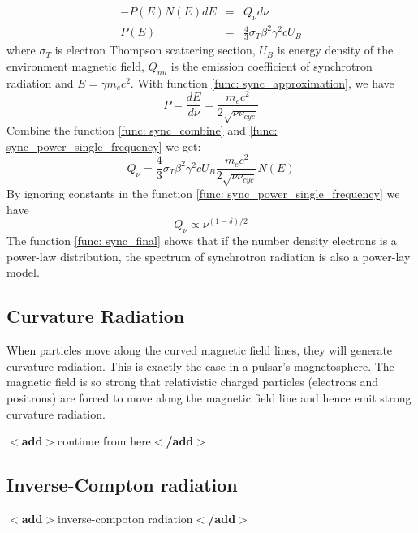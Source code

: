 \documentclass[12pt]{report}
\newcommand{\add}[1]{
  $<$\textbf{add}$>$#1$<$\textbf{/add}$>$
}
\begin{document}
          \begin{eqnarray}
            \label{func: sync_power_single_frequency}
            -P\left(E\right)N\left(E\right)dE &=& Q_{\nu} d\nu\\
            P\left(E\right) &=& \frac{4}{3} \sigma_{T} \beta^2 \gamma^2 c U_B
          \end{eqnarray} 
          where $\sigma_{T}$ is electron Thompson scattering section, $U_B$ is energy density of the environment 
          magnetic field,  $Q_{nu}$ is the emission coefficient of synchrotron radiation 
          and $E=\gamma m_e c^2$. With function \ref{func: sync_approximation}, we have
          \begin{equation}
            \label{func: sync_combine}
            P = \frac{dE}{d\nu} = \frac{m_e c^2}{2\sqrt{\nu \nu_{cyc}}}
          \end{equation}
          Combine the function \ref{func: sync_combine} and \ref{func: sync_power_single_frequency} we get:
          \begin{equation}
            Q_{\nu} = \frac{4}{3} \sigma_{T} \beta^2 \gamma^2 c U_B \frac{m_e c^2}{2\sqrt{\nu \nu_{cyc}}} N\left(E\right)
          \end{equation}
          By ignoring constants in the function \ref{func: sync_power_single_frequency} we have 
          \begin{equation}
            \label{func: sync_final}
            Q_{\nu} \propto \nu^{(1-\delta)/2}
          \end{equation}
          The function \ref{func: sync_final} shows that if the number density electrons is a power-law distribution, 
          the spectrum of synchrotron radiation is also a power-lay model.  

        \subsection{Curvature Radiation}
          When particles move along the curved magnetic field lines, they will generate curvature radiation. This is 
          exactly the case in a pulsar's magnetosphere. The magnetic field is so strong that relativistic 
          charged particles (electrons and positrons) are forced to move along the magnetic field line and hence 
          emit strong curvature radiation. 
          
          \add{continue from here}

        \subsection{Inverse-Compton radiation}
          \add{inverse-compoton radiation}
\end{document}
